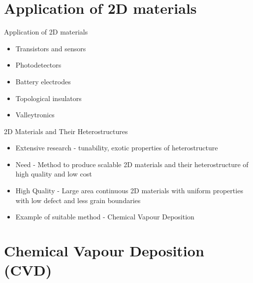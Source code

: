 \documentclass{beamer}
\begin{document}
\section{Application of 2D materials}

\begin{frame}{Application of 2D materials}
    \begin{itemize}
    \setlength\itemsep{2em}
        \item Transistors and sensors
        \item Photodetectors
        \item Battery electrodes
        \item Topological insulators
        \item Valleytronics
    \end{itemize}
\end{frame}

\begin{frame}{2D Materials and Their Heterostructures}
    \begin{itemize}
        \item Extensive research - tunability, exotic properties of heterostructure
        \item Need - Method to produce scalable 2D materials and their heterostructure of high quality and low cost
        \item High Quality - Large area continuous 2D materials with uniform properties with low defect and less grain boundaries
        \item Example of suitable method - Chemical Vapour Deposition
    \end{itemize}
\end{frame}

\section{Chemical Vapour Deposition (CVD)}
\end{document}
